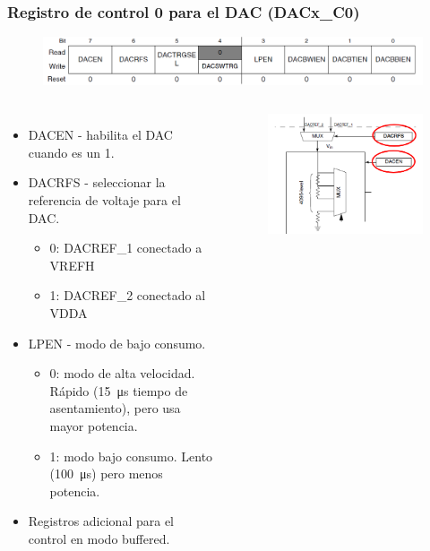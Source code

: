 \documentclass[10.5pt,scale=1.0,t,aspectratio=169,hyperref={pdfpagelabels=false}]{beamer}
\begin{document}
\begin{frame}
	\frametitle{Registro de control 0 para el DAC (DACx\_C0)}
	{\small
	\begin{figure}
		\centering
		\includegraphics[scale=0.5]{fig_DACxC0}
	\end{figure}
	\begin{columns}
		\begin{itemize}
			\setlength\itemsep{0em}
			\item DACEN - habilita el DAC cuando es un 1.
			\item DACRFS - seleccionar la referencia de voltaje para el DAC.
			\begin{itemize}
				\item 0: DACREF\_1 conectado a VREFH
				\item 1: DACREF\_2 conectado al VDDA
			\end{itemize}
			\item LPEN - modo de bajo consumo.
			\begin{itemize}
				\item 0: modo de alta velocidad. Rápido (\SI{15}{\micro\second} tiempo de asentamiento), pero usa mayor potencia. 
				\item 1: modo bajo consumo. Lento (\SI{100}{\micro\second}) pero menos potencia. 
			\end{itemize}
			\item Registros adicional para el control en modo buffered. 
		\end{itemize}
		
		\begin{figure}
			\centering
			\includegraphics[scale=0.5]{fig_DACxC0Schematic}
		\end{figure}
	\end{columns}
	}
\end{frame}
\end{document}
